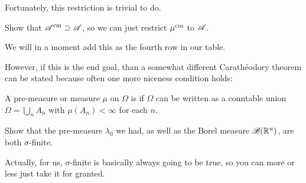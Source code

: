 Fortunately, this restriction is trivial to do.
\begin{ques}
	Show that $\mathscr A^\text{cm} \supset \mathscr A$,
	so we can just restrict $\mu^\text{cm}$ to $\mathscr A$.
\end{ques}
We will in a moment add this as the fourth row in our table.

However, if this is the end goal,
than a somewhat different Carath\'{e}odory theorem
can be stated because often one more niceness condition holds:
\begin{definition}
	A pre-measure or measure $\mu$ on $\Omega$ is 
	if $\Omega$ can be written as a countable union $\Omega = \bigcup_n A_n$
	with $\mu(A_n) < \infty$ for each $n$.
\end{definition}
\begin{ques}
	Show that the pre-measure $\lambda_0$ we had,
	as well as the Borel measure $\mathscr B(\mathbb R^n)$,
	are both $\sigma$-finite.
\end{ques}
Actually, for us, $\sigma$-finite is basically always going to be true,
so you can more or less just take it for granted.

